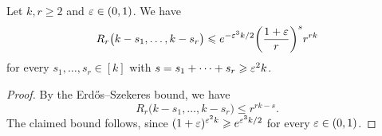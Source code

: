 
\begin{lemma}
  \label{lem:many:ESz:steps} %
  Let \(k,r \ge 2\) and \(\varepsilon \in (0,1)\). We have 
  \begin{equation*}
    R_r\big( k - s_1, \ldots, k - s_r \big) \leqslant e^{-\varepsilon^3 k / 2} \bigg( \frac{1+\varepsilon}{r} \bigg)^s r^{rk}
  \end{equation*}
  for every \(s_1,\ldots,s_r \in [k]\) with \(s = s_1 + \cdots + s_r \geqslant \varepsilon^2 k\).
\end{lemma}
%
\begin{proof}
  By the Erd\H{o}s--Szekeres bound, we have
  \begin{equation*}
    R_r\big( k - s_1, \ldots, k - s_r \big) \le r^{rk - s}.
  \end{equation*}
  The claimed bound follows, since \(( 1 + \varepsilon )^{\varepsilon^2 k} \geqslant e^{\varepsilon^3 k/2}\) for every \(\varepsilon \in (0,1)\).
\end{proof}


